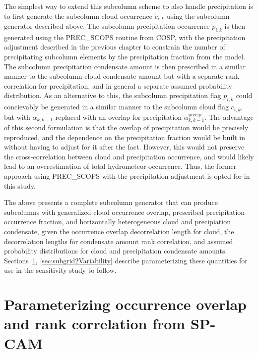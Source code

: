 The simplest way to extend this subcolumn scheme to also handle
precipitation is to first generate the subcolumn cloud occurrence
\(\tilde{c}_{i, k}\) using the subcolumn generator described above. The
subcolumn precipitation occurrence \(\tilde{p}_{i, k}\) is then
generated using the PREC\_SCOPS routine from COSP, with the
precipitation adjustment described in the previous chapter to constrain
the number of precipitating subcolumn elements by the precipitation
fraction from the model. The subcolumn precipitation condensate amount
is then prescribed in a similar manner to the subcolumn cloud condensate
amount but with a separate rank correlation for precipitation, and in
general a separate assumed probability distribution. As an alternative
to this, the subcolumn precipitation flag \(p_{i, k}\) could concievably
be generated in a similar manner to the subcolumn cloud flag
\(c_{i, k}\), but with \(\alpha_{k, k-1}\) replaced with an overlap for
precipitation \(\alpha^\textrm{precip}_{k, k-1}\). The advantage of this
second formulation is that the overlap of precipitation would be
precisely reproduced, and the dependence on the precipitation fraction
would be built in without having to adjust for it after the fact.
However, this would not preserve the cross-correlation between cloud and
precipitation occurrence, and would likely lead to an overestimation of
total hydrometeor occurrence. Thus, the former approach using
PREC\_SCOPS with the precipitation adjustment is opted for in this
study.

The above presents a complete subcolumn generator that can produce
subcolumns with generalized cloud occurrence overlap, prescribed
precipitation occurrence fraction, and horizontally heterogeneous cloud
and precipiation condensate, given the occurrence overlap decorrelation
length for cloud, the decorrelation lengths for condensate amount rank
correlation, and assumed probability distributions for cloud and
precipitation condensate amounts.
Sections~\ref{sec:subgrid2Overlap}, \ref{sec:subgrid2Variability}
describe parameterizing these quantities for use in the sensitivity
study to follow.

\section{Parameterizing occurrence overlap and rank correlation from
SP-CAM}\label{sec:subgrid2Overlap}

